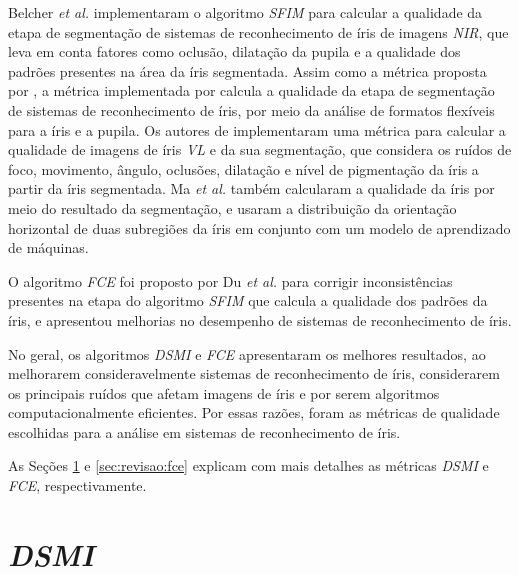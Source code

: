 \par Belcher \textit{et al.} \cite{belcher2008} implementaram o algoritmo \textit{\acrfull{SFIM}} para calcular a qualidade da etapa de segmentação de sistemas de reconhecimento de íris de imagens \textit{\acrshort{NIR}}, que leva em conta fatores como oclusão, dilatação da pupila e a qualidade dos padrões presentes na área da íris segmentada. Assim como a métrica proposta por \cite{belcher2008}, a métrica implementada por \cite{mottalli2009-DSMI-30} calcula a qualidade da etapa de segmentação de sistemas de reconhecimento de íris, por meio da análise de formatos flexíveis para a íris e a pupila. Os autores de \cite{proenca2011} implementaram uma métrica para calcular a qualidade de imagens de íris \textit{\acrshort{VL}} e da sua segmentação, que considera os ruídos de foco, movimento, ângulo, oclusões, dilatação e nível de pigmentação da íris a partir da íris segmentada. Ma \textit{et al.} \cite{ma2003-FIM-7} também calcularam a qualidade da íris por meio do resultado da segmentação, e usaram a distribuição da orientação horizontal de duas subregiões da íris em conjunto com um modelo de aprendizado de máquinas.

\par O algoritmo \textit{\acrshort{FCE}} foi proposto por Du \textit{et al.} \cite{du2010} para corrigir inconsistências presentes na etapa do algoritmo \textit{\acrshort{SFIM}} que calcula a qualidade dos padrões da íris, e apresentou melhorias no desempenho de sistemas de reconhecimento de íris.

\par No geral, os algoritmos \textit{\acrshort{DSMI}} e \textit{\acrshort{FCE}} apresentaram os melhores resultados, ao melhorarem consideravelmente sistemas de reconhecimento de íris, considerarem os principais ruídos que afetam imagens de íris e por serem algoritmos computacionalmente eficientes. Por essas razões, foram as métricas de qualidade escolhidas para a análise em sistemas de reconhecimento de íris.

\par As Seções \ref{sec:revisao:dsmi} e \ref{sec:revisao:fce} explicam com mais detalhes as métricas \textit{\acrshort{DSMI}} e \textit{\acrshort{FCE}}, respectivamente.


\section{\textit{\acrfull{DSMI}}} \label{sec:revisao:dsmi}

